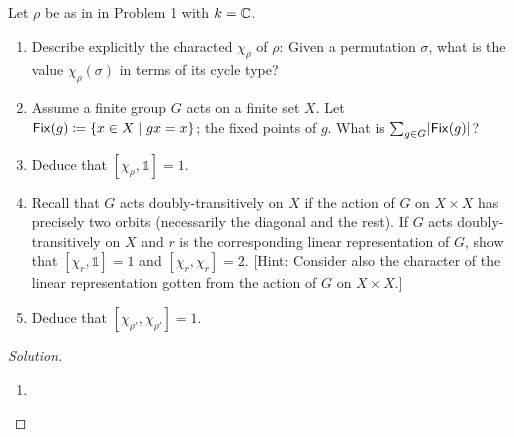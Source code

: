 \newpage



\begin{problem}
Let $\rho$ be as in in Problem 1 with $k = \mathbb{C}$.
\begin{enumerate}[font=\normalfont,label=\textbf{(\alph*)}]

\item Describe explicitly the characted $\chi_\rho$ of $\rho$: Given a permutation $\sigma$, what is the value $\chi_\rho(\sigma)$ in terms of its cycle type?

\item Assume a finite group $G$ acts on a finite set $X$. Let $\mathsf{Fix} (g) \coloneqq \{x\in X\mid gx = x\}$; the fixed points of $g$. What is $\sum_{g\in G}\lvert \mathsf{Fix}(g)\rvert$?

\item Deduce that $[\chi_\rho, \mathbb{1}] = 1$.
\item Recall that $G$ acts doubly-transitively on $X$ if the action of $G$ on $X \times X$ has precisely two orbits (necessarily the diagonal and the rest). If $G$ acts doubly-transitively on $X$ and $r$ is the corresponding linear representation of $G$, show that $[\chi_r, \mathbb{1}] = 1 $ and $[\chi_r, \chi_r] = 2$. [Hint: Consider also the character of the linear representation gotten from the action of $G$ on $X\times X$.]

\item Deduce that $[\chi_{\rho'}, \chi_{\rho'}] =1$.
\end{enumerate}
\end{problem}

\begin{proof}[Solution]
\hfill
\begin{enumerate}[font=\normalfont,label=\textbf{(\alph*)}, wide]
\item
\end{enumerate}
\end{proof}

\newpage



